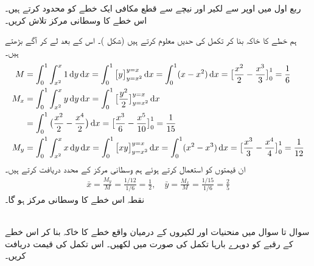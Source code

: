 ربع اول میں اوپر سے لکیر   اور نیچے سے قطع مکافی   ایک خطے کو محدود کرتے ہیں۔ اس خطے  کا وسطانی مرکز تلاش کریں۔

ہم خطے کا خاکہ بنا کر تکمل کی حدیں معلوم کرتے   ہیں (شکل )۔ اس کے بعد  لے کر آگے بڑھتے ہیں۔
\begin{align*}
M&=\int_0^1\int_{x^2}^x1\dif y\dif x=\int_0^1\big[y\big]_{y=x^2}^{y=x}\dif x=\int_0^1(x-x^2)\dif x=\big[\frac{x^2}{2}-\frac{x^3}{3}\big]_0^1=\frac{1}{6}\\
M_x&=\int_0^1\int_{x^2}^xy\dif y\dif x=\int_0^1\big[\frac{y^2}{2}\big]_{y=x^2}^{y=x}\dif x\\
&=\int_0^1\big(\frac{x^2}{2}-\frac{x^4}{2}\big)\dif x=\big[\frac{x^3}{6}-\frac{x^5}{10}\big]_0^1=\frac{1}{15}\\
M_y&=\int_0^1\int_{x^2}^xx\dif y\dif x=\int_0^1\big[xy\big]_{y=x^2}^{y=x}\dif x=\int_0^1(x^2-x^3)\dif x=\big[\frac{x^3}{3}-\frac{x^4}{4}\big]_0^1=\frac{1}{12}
\end{align*}
ان قیمتوں کو استعمال کرتے ہوئے ہم وسطانی مرکز کے محدد دریافت کرتے ہیں۔
\begin{align*}
\bar{x}=\frac{M_y}{M}=\frac{1/12}{1/6}=\frac{1}{2},\quad \bar{y}=\frac{M_x}{M}=\frac{1/15}{1/6}=\frac{2}{5}
\end{align*}
نقطہ  اس خطے کا وسطانی مرکز ہو گا۔

\\
سوال  تا سوال  میں  منحنیات اور لکیروں کے درمیان واقع خطے کا خاکہ بنا کر اس خطے کے رقبے  کو  دوہرے بارہا  تکمل  کی صورت میں لکھیں۔ اس تکمل کی قیمت دریافت کریں۔

